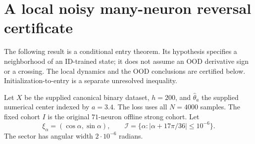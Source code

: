 \documentclass[10pt]{article}
\begin{document}
\section{A local noisy many-neuron reversal certificate}
\label{sec:local-result}
The following result is a conditional entry theorem. Its hypothesis specifies
a neighborhood of an ID-trained state; it does not assume an OOD derivative
sign or a crossing. The local dynamics and the OOD conclusions are certified
below. Initialization-to-entry is a separate unresolved inequality.

Let $X$ be the supplied canonical binary dataset, $h=200$, and
$\widehat\theta_a$ the supplied numerical center indexed by $a=3.4$.
The loss uses all $N=4000$ samples. The fixed cohort $I$ is the original
$71$-neuron offline strong cohort. Let
\[
 \xi_\alpha=(\cos\alpha,\sin\alpha),\qquad
 \mathcal I=\{\alpha:|\alpha+17\pi/36|\le10^{-6}\}.
\]
The sector has angular width $2\cdot10^{-6}$ radians.
\end{document}
